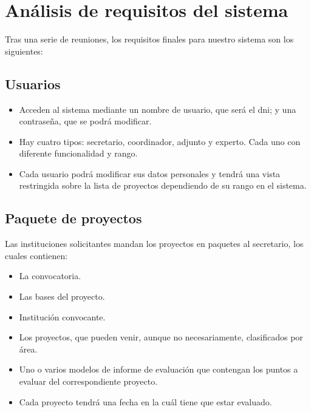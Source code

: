 \documentclass[12pt,a4paper,titlepage,spanish,twoside]{book}
\begin{document}
\section{Análisis de requisitos del sistema}
Tras una serie de reuniones, los requisitos finales para nuestro sistema son
los siguientes: 

\subsection{Usuarios}
\begin{itemize}
\item Acceden al sistema mediante un nombre de usuario, que será el dni; y una 
contraseña, que se podrá modificar.
\item Hay cuatro tipos: secretario, coordinador, adjunto y experto. Cada uno
  con diferente funcionalidad y rango. 
\item Cada usuario podrá modificar sus datos personales y tendrá una vista
  restringida sobre la lista de proyectos dependiendo de su rango en el 
  sistema.
\end{itemize}

\subsection{Paquete de proyectos}
Las instituciones solicitantes mandan los proyectos en paquetes al
secretario, los cuales contienen: 
\begin{itemize}
\item La convocatoria.
\item Las bases del proyecto.
\item Institución convocante.
\item Los proyectos, que pueden venir, aunque no necesariamente, clasificados
  por área. 
\item Uno o varios modelos de informe de evaluación que contengan los puntos
  a evaluar del correspondiente proyecto. 
\item Cada proyecto tendrá una fecha en la cuál tiene que estar evaluado.
\end{itemize}
\end{document}
